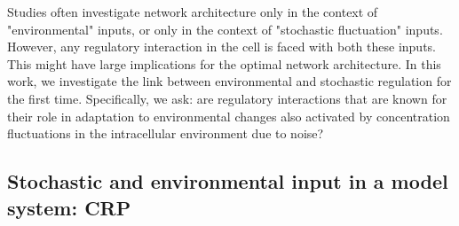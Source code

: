 Studies often investigate network architecture only in the context of "environmental" inputs, or only in the context of "stochastic fluctuation" inputs.
%
However, any regulatory interaction in the cell is faced with both these inputs.
%
This might have large implications for the optimal network architecture.
%
In this work, we investigate the link between environmental and stochastic regulation for the first time. %
%
Specifically, we ask:
are regulatory interactions that are known for their role in adaptation to environmental changes also 
activated 
by concentration fluctuations in the intracellular environment due to noise?



\subsection*{Stochastic and environmental input in a model system: CRP}

